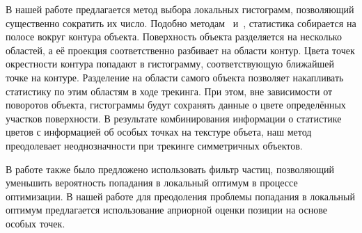 В нашей работе предлагается метод выбора локальных гистограмм, позволяющий
существенно сократить их число. 
Подобно методам~\cite{Hexner2016,Tjaden2017,Tjaden2018}
и~\cite{Zhong2018}, статистика собирается на полосе вокруг контура объекта.
Поверхность объекта разделяется на несколько областей, а её проекция
соответственно разбивает на области контур.
Цвета точек окрестности контура попадают в гистограмму, соответствующую
ближайшей точке на контуре.
Разделение на области самого объекта позволяет накапливать статистику по этим
областям в ходе трекинга.
При этом, вне зависимости от поворотов объекта, гистограммы будут сохранять
данные о цвете определённых участков поверхности.
В результате комбинирования информации о статистике цветов с информацией об
особых точках на текстуре объета, наш метод преодолевает неоднозначности при
трекинге симметричных объектов.

В работе \cite{Zhao2014} также было предложено использовать фильтр частиц,
позволяющий уменьшить вероятность попадания в локальный оптимум в процессе
оптимизации. В нашей работе для преодоления проблемы попадания в локальный
оптимум предлагается использование априорной оценки позиции на основе особых
точек.

